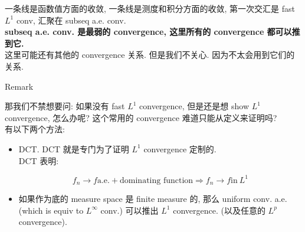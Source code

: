 一条线是函数值方面的收敛, 一条线是测度和积分方面的收敛, 第一次交汇是 fast \(L^{1}\) conv, 汇聚在 subseq a.e. conv.\\
\textbf{subseq a.e. conv. 是最弱的 convergence, 这里所有的 convergence 都可以推到它.}\\
这里可能还有其他的 convergence 关系. 但是我们不关心. 因为不太会用到它们的关系.

\begin{qlremark}{Remark}

那我们不禁想要问: 如果没有 fast \(L^{1}\) convergence, 但是还是想 show \(L^{1}\) convergence, 怎么办呢? 这个常用的 convergence 难道只能从定义来证明吗?\\
有以下两个方法:

\begin{itemize}
\item
  DCT. DCT 就是专门为了证明 \(L^{1}\) convergence 定制的.\\
  DCT 表明:

  \[f_{n}\rightarrow f\text{a.e.} + \text{dominating function}\Longrightarrow f_{n}\rightarrow f\text{in}\ L^{1}\]
\item
  如果作为底的 measure space 是 finite measure 的, 那么 uniform conv. a.e. (which is equiv to \(L^{\infty}\) conv.) 可以推出 \(L^{1}\) convergence. (以及任意的 \(L^{p}\) convergence).
\end{itemize}

\end{qlremark}
